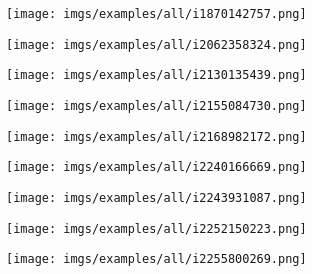 \documentclass{article}
\begin{document}
\begin{figure}[htbp]
  \begin{subfigure}{0.3\textwidth}
    \texttt{[image: imgs/examples/all/i1870142757.png]}
  \end{subfigure}
  \begin{subfigure}{0.3\textwidth}
    \texttt{[image: imgs/examples/all/i2062358324.png]}
  \end{subfigure}
  \begin{subfigure}{0.3\textwidth}
    \texttt{[image: imgs/examples/all/i2130135439.png]}
  \end{subfigure}
  
  \begin{subfigure}{0.3\textwidth}
    \texttt{[image: imgs/examples/all/i2155084730.png]}
  \end{subfigure}
  \begin{subfigure}{0.3\textwidth}
    \texttt{[image: imgs/examples/all/i2168982172.png]}
  \end{subfigure}
  \begin{subfigure}{0.3\textwidth}
    \texttt{[image: imgs/examples/all/i2240166669.png]}
  \end{subfigure}
  
  \begin{subfigure}{0.3\textwidth}
    \texttt{[image: imgs/examples/all/i2243931087.png]}
  \end{subfigure}
  \begin{subfigure}{0.3\textwidth}
    \texttt{[image: imgs/examples/all/i2252150223.png]}
  \end{subfigure}
  \begin{subfigure}{0.3\textwidth}
    \texttt{[image: imgs/examples/all/i2255800269.png]}
  \end{subfigure}
  
\end{figure}
\end{document}
